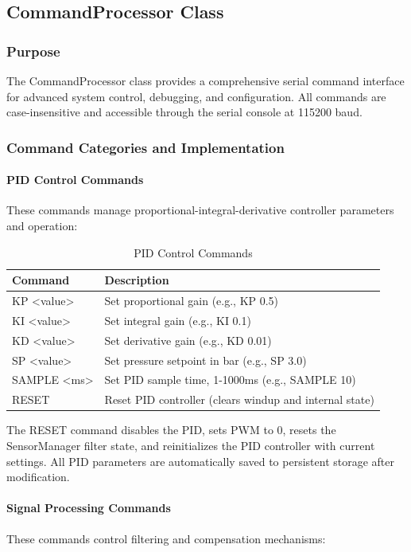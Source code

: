 \documentclass[12pt,a4paper]{article}
\begin{document}
\subsection{CommandProcessor Class}

\subsubsection{Purpose}
The CommandProcessor class provides a comprehensive serial command interface for advanced system control, debugging, and configuration. All commands are case-insensitive and accessible through the serial console at 115200 baud.

\subsubsection{Command Categories and Implementation}

\paragraph{PID Control Commands}
These commands manage proportional-integral-derivative controller parameters and operation:

\begin{table}[H]
\centering
\begin{tabular}{@{}ll@{}}
\toprule
\textbf{Command} & \textbf{Description} \\
\midrule
KP <value> & Set proportional gain (e.g., KP 0.5) \\
KI <value> & Set integral gain (e.g., KI 0.1) \\
KD <value> & Set derivative gain (e.g., KD 0.01) \\
SP <value> & Set pressure setpoint in bar (e.g., SP 3.0) \\
SAMPLE <ms> & Set PID sample time, 1-1000ms (e.g., SAMPLE 10) \\
RESET & Reset PID controller (clears windup and internal state) \\
\bottomrule
\end{tabular}
\caption{PID Control Commands}
\end{table}

The RESET command disables the PID, sets PWM to 0, resets the SensorManager filter state, and reinitializes the PID controller with current settings. All PID parameters are automatically saved to persistent storage after modification.

\paragraph{Signal Processing Commands}
These commands control filtering and compensation mechanisms:
\end{document}
